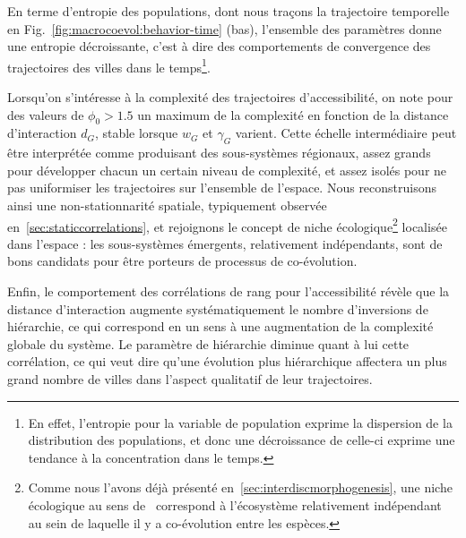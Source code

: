 En terme d'entropie des populations, dont nous traçons la trajectoire temporelle en Fig.~\ref{fig:macrocoevol:behavior-time} (bas), l'ensemble des paramètres donne une entropie décroissante, c'est à dire des comportements de convergence des trajectoires des villes dans le temps\footnote{En effet, l'entropie pour la variable de population exprime la dispersion de la distribution des populations, et donc une décroissance de celle-ci exprime une tendance à la concentration dans le temps.}.



Lorsqu'on s'intéresse à la complexité des trajectoires d'accessibilité, on note pour des valeurs de $\phi_0 > 1.5$ un maximum de la complexité en fonction de la distance d'interaction $d_G$, stable lorsque $w_G$ et $\gamma_G$ varient. Cette échelle intermédiaire peut être interprétée comme produisant des sous-systèmes régionaux, assez grands pour développer chacun un certain niveau de complexité, et assez isolés pour ne pas uniformiser les trajectoires sur l'ensemble de l'espace. Nous reconstruisons ainsi une non-stationnarité spatiale, typiquement observée en~\ref{sec:staticcorrelations}, et rejoignons le concept de niche écologique\footnote{Comme nous l'avons déjà présenté en~\ref{sec:interdiscmorphogenesis}, une niche écologique au sens de~\cite{holland2012signals} correspond à l'écosystème relativement indépendant au sein de laquelle il y a co-évolution entre les espèces.} localisée dans l'espace : les sous-systèmes émergents, relativement indépendants, sont de bons candidats pour être porteurs de processus de co-évolution.



Enfin, le comportement des corrélations de rang pour l'accessibilité révèle que la distance d'interaction augmente systématiquement le nombre d'inversions de hiérarchie, ce qui correspond en un sens à une augmentation de la complexité globale du système. Le paramètre de hiérarchie diminue quant à lui cette corrélation, ce qui veut dire qu'une évolution plus hiérarchique affectera un plus grand nombre de villes dans l'aspect qualitatif de leur trajectoires.



